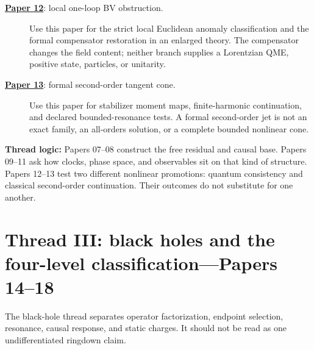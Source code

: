 \documentclass[11pt]{article}
\newcommand{\paperlink}[2]{\href{#1}{\textbf{Paper #2}}}
\begin{document}
\begin{description}
\item[\paperlink{12-pure-weyl-one-loop-bv-anomaly.pdf}{12}: local one-loop BV
obstruction.]
Use this paper for the strict local Euclidean anomaly classification and the
formal compensator restoration in an enlarged theory.  The compensator
changes the field content; neither branch supplies a Lorentzian QME, positive
state, particles, or unitarity.

\item[\paperlink{13-compact-weyl-maxwell-second-order-tangent-cone.pdf}{13}:
formal second-order tangent cone.]
Use this paper for stabilizer moment maps, finite-harmonic continuation, and
declared bounded-resonance tests.  A formal second-order jet is not an exact
family, an all-orders solution, or a complete bounded nonlinear cone.
\end{description}

\textbf{Thread logic:}
Papers 07--08 construct the free residual and causal base.  Papers 09--11 ask
how clocks, phase space, and observables sit on that kind of structure.
Papers 12--13 test two different nonlinear promotions: quantum consistency
and classical second-order continuation.  Their outcomes do not substitute
for one another.

\section{Thread III: black holes and the four-level classification---Papers 14--18}

The black-hole thread separates operator factorization, endpoint selection,
resonance, causal response, and static charges.  It should not be read as one
undifferentiated ringdown claim.
\end{document}
